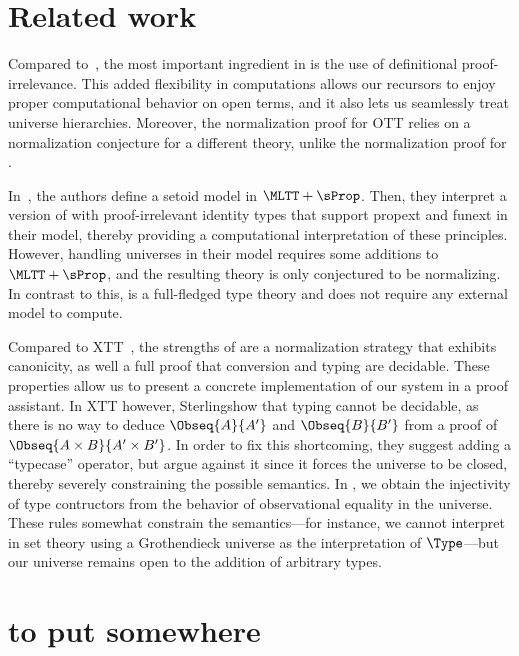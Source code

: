 \section{Related work}

Compared to~, the most important ingredient in \SetoidTT is the
use of definitional proof-irrelevance.
%
This added flexibility in computations allows our recursors to enjoy proper computational
behavior on open terms, and it also lets us seamlessly treat universe hierarchies.
%
Moreover, the normalization proof for OTT relies on a normalization conjecture for a different
theory, unlike the normalization proof for \SetoidTT.

In~, the authors define a setoid model in \( \MLTT+\sProp \). Then, they
interpret a version of \MLTT with proof-irrelevant identity types that support propext and
funext in their model, thereby providing a computational interpretation of these principles.
%
However, handling universes in their model requires some additions to \( \MLTT+\sProp \), and
the resulting theory is only conjectured to be normalizing.
%
In contrast to this, \SetoidTT is a full-fledged type theory and does not require any external
model to compute.

Compared to XTT~, the strengths of \SetoidTT are a
normalization strategy that exhibits canonicity, as well a full proof that conversion and typing
are decidable. These properties allow us to present a concrete implementation of our system
in a proof assistant.
%
In XTT however, Sterling\etal show that typing cannot be decidable, as there is no way to deduce
\( \Obseq{A}{A'} \) and \( \Obseq{B}{B'} \) from a proof of \( \Obseq{A \times B}{A' \times B'} \).
%
In order to fix this shortcoming, they suggest adding a ``typecase'' operator, but
argue against it since it forces the universe to be closed, thereby severely constraining the
possible semantics.
%
In \SetoidTT, we obtain the injectivity of type contructors from the behavior of observational
equality in the universe. These rules somewhat constrain the semantics---for instance, we cannot
interpret \SetoidTT in set theory using a Grothendieck universe as the interpretation of \( \Type \)---but our universe remains open to the addition of arbitrary types.

\section{to put somewhere}

